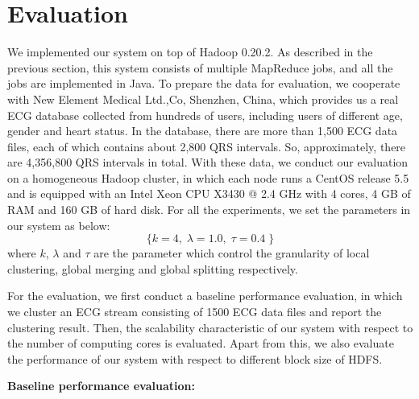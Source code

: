 \documentclass[conference]{IEEEtran}
\begin{document}
\section{Evaluation}
We implemented our system on top of Hadoop 0.20.2. As described in the previous section, this system consists of multiple MapReduce jobs, and all the jobs are implemented in Java. To prepare the data for evaluation, we cooperate with New Element Medical Ltd.,Co, Shenzhen, China, which provides us a real ECG database collected from hundreds of users, including users of different age, gender and heart status. In the database, there are more than 1,500 ECG data files, each of which contains about 2,800 QRS intervals. So, approximately, there are 4,356,800 QRS intervals in total. With these data, we conduct our evaluation on a homogeneous Hadoop cluster, in which each node runs a CentOS release 5.5 and is equipped with an Intel Xeon CPU X3430 @ 2.4 GHz with 4 cores, 4 GB of RAM and 160 GB of hard disk. For all the experiments, we set the parameters in our system as below:
\begin{equation}
\{ k=4, \; \lambda=1.0, \; \tau=0.4 \;  \}
\end{equation}
where $ k $, $ \lambda $ and $ \tau $ are the parameter which control the granularity of local clustering, global merging and global splitting respectively.


For the evaluation, we first conduct a baseline performance evaluation, in which we cluster an ECG stream consisting of 1500 ECG data files and report the clustering result. Then, the scalability characteristic of our system with respect to the number of computing cores is evaluated. Apart from this, we also evaluate the performance of our system with respect to different block size of HDFS. 

\textbf{Baseline performance evaluation:}
\end{document}
